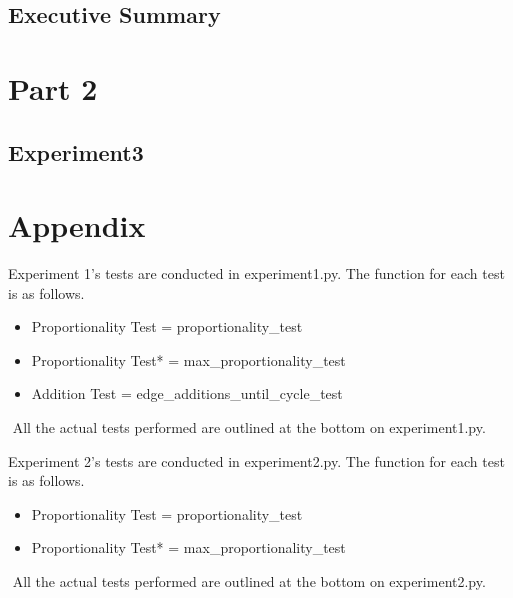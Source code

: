 \documentclass[12pt]{article}
\begin{document}
\subsection{Executive Summary}


%
%
%
%
\newpage
\section{Part 2}
\subsection{Experiment3}

%
%
%
%
\newpage
\section{Appendix}

Experiment 1's tests are conducted in experiment1.py.
The function for each test is as follows.
\begin{itemize}
    \item Proportionality Test = proportionality\_test\(\)
    \item Proportionality Test* = max\_proportionality\_test\(\)
    \item Addition Test = edge\_additions\_until\_cycle\_test\(\)
\end{itemize}
$ $
\newline
All the actual tests performed are outlined at the bottom on experiment1.py.
\newline
$ $
\newline

Experiment 2's tests are conducted in experiment2.py.
The function for each test is as follows.
\begin{itemize}
    \item Proportionality Test = proportionality\_test\(\)
    \item Proportionality Test* = max\_proportionality\_test\(\)
\end{itemize}
$ $
\newline
All the actual tests performed are outlined at the bottom on experiment2.py.



\end{document}
